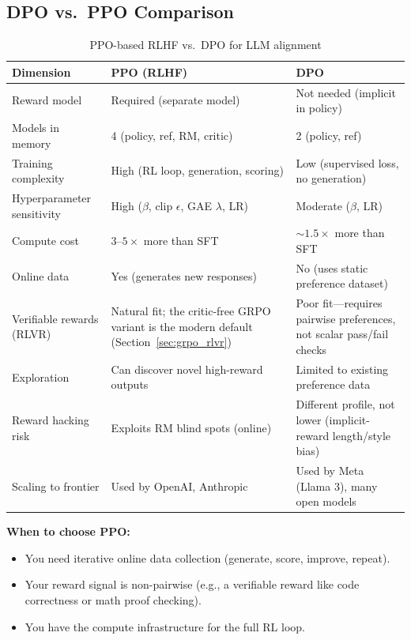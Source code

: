 \subsection{DPO vs.\ PPO Comparison}

\begin{table}[H]
\centering
\caption{PPO-based RLHF vs.\ DPO for LLM alignment}
\begin{tabularx}{\textwidth}{lXX}
\toprule
\textbf{Dimension} & \textbf{PPO (RLHF)} & \textbf{DPO} \\
\midrule
Reward model & Required (separate model) & Not needed (implicit in policy) \\
Models in memory & 4 (policy, ref, RM, critic) & 2 (policy, ref) \\
Training complexity & High (RL loop, generation, scoring) & Low (supervised loss, no generation) \\
Hyperparameter sensitivity & High ($\beta$, clip $\epsilon$, GAE $\lambda$, LR) & Moderate ($\beta$, LR) \\
Compute cost & $3$--$5\times$ more than SFT & $\sim 1.5\times$ more than SFT \\
Online data & Yes (generates new responses) & No (uses static preference dataset) \\
Verifiable rewards (RLVR) & Natural fit; the critic-free GRPO variant is the modern default (Section~\ref{sec:grpo_rlvr}) & Poor fit---requires pairwise preferences, not scalar pass/fail checks \\
Exploration & Can discover novel high-reward outputs & Limited to existing preference data \\
Reward hacking risk & Exploits RM blind spots (online) & Different profile, not lower (implicit-reward length/style bias) \\
Scaling to frontier & Used by OpenAI, Anthropic & Used by Meta (Llama 3), many open models \\
\bottomrule
\end{tabularx}
\end{table}

\textbf{When to choose PPO:}
\begin{itemize}
    \item You need iterative online data collection (generate, score, improve, repeat).
    \item Your reward signal is non-pairwise (e.g., a verifiable reward like code correctness or math proof checking).
    \item You have the compute infrastructure for the full RL loop.
\end{itemize}

